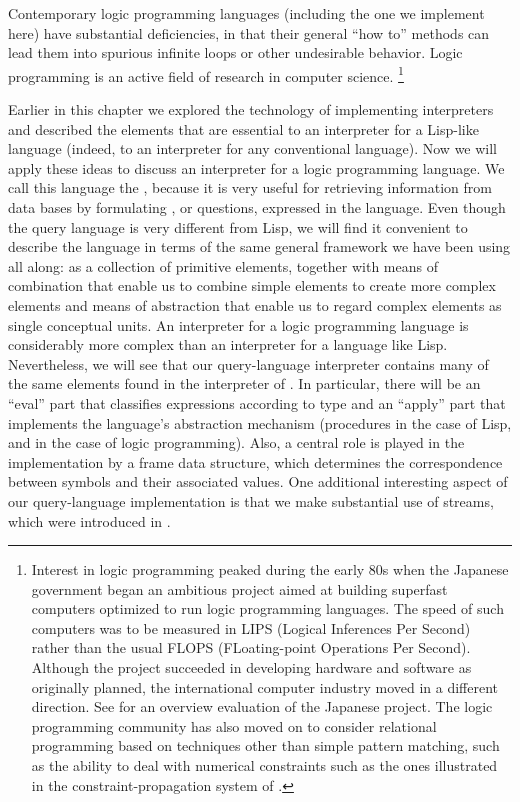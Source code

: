 Contemporary logic programming languages (including the one we implement here) have substantial deficiencies, in that their general “how to” methods can lead them into spurious infinite loops or other undesirable behavior.
Logic programming is an active field of research in computer science.%
\footnote{
	Interest in logic programming peaked during the early 80s when the Japanese government began an ambitious project aimed at building superfast computers optimized to run logic programming languages.
	The speed of such computers was to be measured in LIPS (Logical Inferences Per Second) rather than the usual FLOPS (FLoating-point Operations Per Second).
	Although the project succeeded in developing hardware and software as originally planned, the international computer industry moved in a different direction.
	See  for an overview evaluation of the Japanese project.
	The logic programming community has also moved on to consider relational programming based on techniques other than simple pattern matching, such as the ability to deal with numerical constraints such as the ones illustrated in the constraint-propagation system of .
}

Earlier in this chapter we explored the technology of implementing interpreters and described the elements that are essential to an interpreter for a Lisp-like language (indeed, to an interpreter for any conventional language).
Now we will apply these ideas to discuss an interpreter for a logic programming language.
We call this language the , because it is very useful for retrieving information from data bases by formulating , or questions, expressed in the language.
Even though the query language is very different from Lisp, we will find it convenient to describe the language in terms of the same general framework we have been using all along:
as a collection of primitive elements, together with means of combination that enable us to combine simple elements to create more complex elements and means of abstraction that enable us to regard complex elements as single conceptual units.
An interpreter for a logic programming language is considerably more complex than an interpreter for a language like Lisp.
Nevertheless, we will see that our query-language interpreter contains many of the same elements found in the interpreter of .
In particular, there will be an “eval” part that classifies expressions according to type and an “apply” part that implements the language’s abstraction mechanism (procedures in the case of Lisp, and  in the case of logic programming).
Also, a central role is played in the implementation by a frame data structure, which determines the correspondence between symbols and their associated values.
One additional interesting aspect of our query-language implementation is that we make substantial use of streams, which were introduced in .



